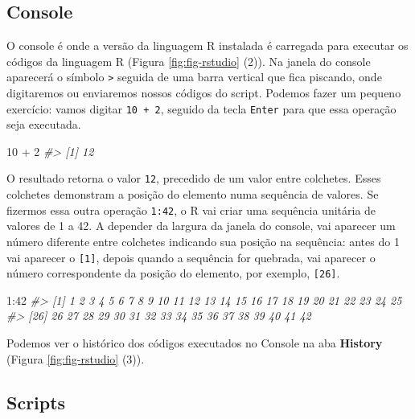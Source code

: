 \documentclass[
]{book}
\newenvironment{Shaded}{\begin{snugshade}}{\end{snugshade}}
\newcommand{\CommentTok}[1]{\textcolor[rgb]{0.37,0.37,0.37}{\textit{#1}}}
\newcommand{\DecValTok}[1]{\textcolor[rgb]{0.06,0.06,0.06}{#1}}
\newcommand{\SpecialCharTok}[1]{\textcolor[rgb]{0,0,0}{#1}}
\begin{document}
\hypertarget{console}{%
\subsection{Console}\label{console}}

O console é onde a versão da linguagem R instalada é carregada para executar os códigos da linguagem R (Figura \ref{fig:fig-rstudio} (2)). Na janela do console aparecerá o símbolo \texttt{\textgreater{}} seguida de uma barra vertical \texttt{\textbar{}} que fica piscando, onde digitaremos ou enviaremos nossos códigos do script. Podemos fazer um pequeno exercício: vamos digitar \texttt{10\ +\ 2}, seguido da tecla \texttt{Enter} para que essa operação seja executada.

\begin{Shaded}
\begin{Highlighting}[]
\DecValTok{10} \SpecialCharTok{+} \DecValTok{2}
\CommentTok{\#\textgreater{} [1] 12}
\end{Highlighting}
\end{Shaded}

O resultado retorna o valor \texttt{12}, precedido de um valor entre colchetes. Esses colchetes demonstram a posição do elemento numa sequência de valores. Se fizermos essa outra operação \texttt{1:42}, o R vai criar uma sequência unitária de valores de 1 a 42. A depender da largura da janela do console, vai aparecer um número diferente entre colchetes indicando sua posição na sequência: antes do 1 vai aparecer o \texttt{{[}1{]}}, depois quando a sequência for quebrada, vai aparecer o número correspondente da posição do elemento, por exemplo, \texttt{{[}26{]}}.

\begin{Shaded}
\begin{Highlighting}[]
\DecValTok{1}\SpecialCharTok{:}\DecValTok{42}
\CommentTok{\#\textgreater{}  [1]  1  2  3  4  5  6  7  8  9 10 11 12 13 14 15 16 17 18 19 20 21 22 23 24 25}
\CommentTok{\#\textgreater{} [26] 26 27 28 29 30 31 32 33 34 35 36 37 38 39 40 41 42}
\end{Highlighting}
\end{Shaded}

Podemos ver o histórico dos códigos executados no Console na aba \textbf{History} (Figura \ref{fig:fig-rstudio} (3)).

\hypertarget{scripts}{%
\subsection{Scripts}\label{scripts}}
\end{document}
